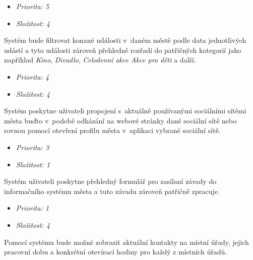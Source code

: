 \begin{itemize}
  \item \textit{Priorita: 5}
  \item \textit{Složitost: 4}
\end{itemize}



Systém bude filtrovat konané události v~daném městě podle data jednotlivých udástí a tyto události zároveň přehledně rozřadí do patřičných
kategorií jako například \textit{Kino}, \textit{Divadlo}, \textit{Celodenní akce} \textit{Akce pro děti} a další.

\begin{itemize}
  \item \textit{Priorita: 4}
  \item \textit{Složitost: 4}
\end{itemize}

Systém poskytne uživateli propojení s~aktuálně používanými sociálními sítěmi města buďto v~podobě odkázání na webové stránky 
dané sociální sítě nebo rovnou pomocí otevření profilu města v~aplikaci vybrané sociální sítě.  

\begin{itemize}
  \item \textit{Priorita: 3}
  \item \textit{Složitost: 1}
\end{itemize}

Systém uživateli poskytne přehledný formulář pro zasílaní závady do informačního systému města a tuto závadu zároveň patřičně zpracuje.

\begin{itemize}
  \item \textit{Priorita: 1}
  \item \textit{Složitost: 4}
\end{itemize}

Pomocí systému bude možné zobrazit aktuální kontakty na místní úřady, jejich pracovní dobu a konkrétní otevírací hodiny pro každý z místních úřadů.


